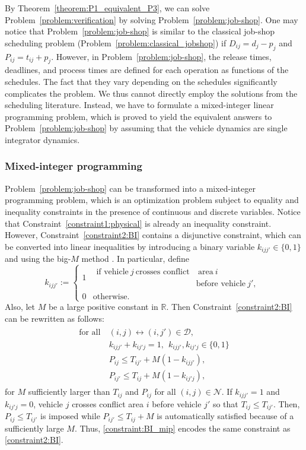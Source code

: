 \documentclass{sig-alternate}
\begin{document}
By Theorem~\ref{theorem:P1_equivalent_P3}, we can solve Problem~\ref{problem:verification} by solving Problem~\ref{problem:job-shop}. One may notice that Problem~\ref{problem:job-shop} is similar to the classical job-shop scheduling problem (Problem~\ref{problem:classical_jobshop}) if $D_{ij}=d_j-p_j$ and $P_{ij}=t_{ij}+p_j$. However, in Problem~\ref{problem:job-shop}, the release times, deadlines, and process times are defined for each operation as functions of the schedules. The fact that they vary depending on the schedules significantly complicates the problem. We thus cannot directly employ the solutions from the scheduling literature. Instead, we have to formulate a mixed-integer linear programming problem, which is proved to yield the equivalent answers to Problem~\ref{problem:job-shop} by assuming that the vehicle dynamics are single integrator dynamics.

\subsubsection{Mixed-integer programming}
Problem~\ref{problem:job-shop} can be transformed into a mixed-integer programming problem, which is an optimization problem subject to equality and inequality constraints in the presence of continuous and discrete variables. Notice that Constraint~\eqref{constraint1:physical} is already an inequality constraint. However, Constraint~\eqref{constraint2:BI} contains a disjunctive constraint, which can be converted into linear inequalities by introducing a binary variable $k_{ijj'}\in\{0,1\}$ and using the big-$M$ method \cite{grossmann_generalized_2012}. In particular, define $$k_{ijj'}:=\begin{cases}
1 & \begin{split}
\text{if vehicle}~j~\text{crosses conflict}&~\text{area}~i\\&\text{before vehicle}~j',
\end{split}\\ 
0 & \text{otherwise}.
\end{cases}$$
Also, let $M$ be a large positive constant in $\mathbb{R}$. Then Constraint~\eqref{constraint2:BI} can be rewritten as follows:
\begin{align}
\begin{split}\label{constraint:BI_mip}
\text{for all}~&(i,j)\leftrightarrow (i,j') \in\mathcal{D},\\
&k_{ijj'}+k_{ij'j}=1, ~~k_{ijj'},k_{ij'j}\in\{0,1\}\\
&P_{ij} \leq T_{ij'} + M(1-k_{ijj'}), \\
&P_{ij'}\leq T_{ij}+M(1-k_{ij'j}),
\end{split}
\end{align}
for $M$ sufficiently larger than $T_{ij}$ and $P_{ij}$ for all $(i,j)\in\mathcal{N}$. If $k_{ijj'}=1$ and $k_{ij'j}=0$, vehicle $j$ crosses conflict area $i$ before vehicle $j'$ so that $T_{ij}\leq T_{ij'}$. Then, $P_{ij}\leq T_{ij'}$ is imposed while $P_{ij'}\leq T_{ij}+M$ is automatically satisfied because of a sufficiently large $M$. Thus, \eqref{constraint:BI_mip} encodes the same constraint as \eqref{constraint2:BI}.
\end{document}
